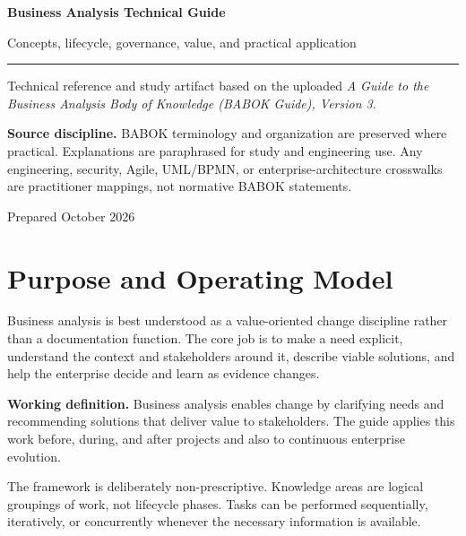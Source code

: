 \documentclass[11pt]{article}
\begin{document}
\hypersetup{pageanchor=false}%
\begin{titlepage}
\centering
\vspace*{1.15in}
{\Huge\bfseries\color{BANavy} Business Analysis Technical Guide\par}
\vspace{0.35in}
{\Large\color{BAOrange} Concepts, lifecycle, governance, value, and practical application\par}
\vspace{0.55in}
\rule{0.78\textwidth}{1.2pt}\par
\vspace{0.35in}
{\large Technical reference and study artifact based on the uploaded \emph{A Guide to the Business Analysis Body of Knowledge (BABOK Guide), Version 3}.\par}
\vfill
\begin{keybox}
\textbf{Source discipline.} BABOK terminology and organization are preserved where practical. Explanations are paraphrased for study and engineering use. Any engineering, security, Agile, UML/BPMN, or enterprise-architecture crosswalks are practitioner mappings, not normative BABOK statements.
\end{keybox}
\vspace{0.35in}
{\small Prepared October 2026\par}
\end{titlepage}\hypersetup{pageanchor=true}
\tableofcontents
\newpage
\section{Purpose and Operating Model}
Business analysis is best understood as a value-oriented change discipline rather than a documentation function. The core job is to make a need explicit, understand the context and stakeholders around it, describe viable solutions, and help the enterprise decide and learn as evidence changes.

\begin{keybox}
\textbf{Working definition.} Business analysis enables change by clarifying needs and recommending solutions that deliver value to stakeholders. The guide applies this work before, during, and after projects and also to continuous enterprise evolution.
\end{keybox}

The framework is deliberately non-prescriptive. Knowledge areas are logical groupings of work, not lifecycle phases. Tasks can be performed sequentially, iteratively, or concurrently whenever the necessary information is available.
\end{document}

